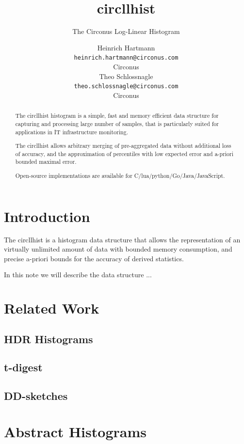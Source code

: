 \documentclass{article}
\title{circllhist}
\subtitle{The Circonus Log-Linear Histogram}
\author{
  Heinrich Hartmann \\
  \texttt{heinrich.hartmann@circonus.com} \\
  Circonus \\
  \And
  Theo Schlossnagle \\
  \texttt{theo.schlossnagle@circonus.com} \\
  Circonus
}
\theoremstyle{plain}
\theoremstyle{remark}
\begin{document}
\maketitle

\begin{abstract}
  The circllhist histogram is a simple, fast and memory efficient data structure for capturing
  and processing large number of samples, that is particularly suited for applications in
  IT infrastructure monitoring.

  The circllhist allows arbitrary merging of pre-aggregated data without additional loss of accuracy,
  and the approximation of percentiles with low expected error and a-priori bounded maximal error.

  Open-source implementations are available for C/lua/python/Go/Java/JavaScript.
\end{abstract}

\tableofcontents

\section{Introduction}
The circllhist is a histogram data structure that allows the representation of an virtually
unlimited amount of data with bounded memory consumption, and precise a-priori bounds for the
accuracy of derived statistics.

In this note we will describe the data structure ...

\section{Related Work}

\subsection{HDR Histograms}

\subsection{t-digest}

\subsection{DD-sketches}

\section{Abstract Histograms}
\end{document}

